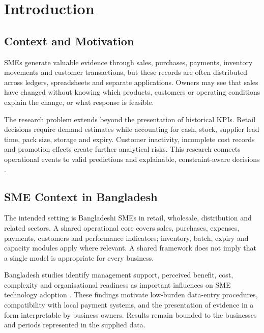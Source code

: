 \documentclass[a4paper,11pt,oneside]{book}
\renewcommand{\sectionmark}[1]{}
\theoremstyle{plain}
\theoremstyle{definition}
\theoremstyle{remark}
\begin{document}
\mainmatter
\pagestyle{fancy}
\fancyhead{}
\rhead{\thepage}
\lhead{\fancyplain{}{\rightmark}}
\renewcommand{\sectionmark}[1]{\markright{\thesection\ #1}}

\chapter{Introduction}
\label{chapter_introduction}

\section{Context and Motivation}
SMEs generate valuable evidence through sales, purchases, payments, inventory
movements and customer transactions, but these records are often distributed
across ledgers, spreadsheets and separate applications. Owners may see that
sales have changed without knowing which products, customers or operating
conditions explain the change, or what response is feasible.

The research problem extends beyond the presentation of historical KPIs. Retail decisions
require demand estimates while accounting for cash, stock, supplier lead time,
pack size, storage and expiry. Customer inactivity, incomplete cost records
and promotion effects create further analytical risks. This research connects
operational events to valid predictions and explainable, constraint-aware
decisions \cite{chen2012business,fildes2022retail,makridakis2022m5}.

\section{SME Context in Bangladesh}
The intended setting is Bangladeshi SMEs in retail, wholesale, distribution
and related sectors. A shared operational core covers sales, purchases,
expenses, payments, customers and performance indicators; inventory, batch,
expiry and capacity modules apply where relevant. A shared framework does not imply that a single model is
appropriate for every business.

Bangladesh studies identify management support, perceived benefit, cost,
complexity and organisational readiness as important influences on SME
technology adoption \cite{hoque2016ict,shahadat2023digital}. These findings
motivate low-burden data-entry procedures, compatibility with local payment
systems, and the presentation of evidence in a form interpretable by business
owners. Results remain bounded to the businesses and periods represented
in the supplied data.
\end{document}
